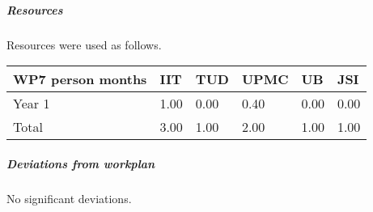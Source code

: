 

\subparagraph{Resources}

Resources were used as follows.

\begin{center}
\begin{tabular}{|C{1.5cm}|C{1.5cm}|C{1.5cm}|C{2cm}|C{2cm}|C{2cm}|}
\hline
\footnotesize \textbf{WP7 person months}& \footnotesize \textbf{IIT}&\footnotesize \textbf{TUD}&\footnotesize \textbf{UPMC}& \footnotesize \textbf{UB} &\footnotesize \textbf{JSI}\\ \hline
\footnotesize Year 1 &  1.00 & 0.00 & 0.40 & 0.00 & 0.00 \\  \hline
\footnotesize Total & 3.00 & 1.00 & 2.00 & 1.00	 & 1.00 \\ \hline
\end{tabular}
\end{center}

\subparagraph{Deviations from workplan} 
No significant deviations. 